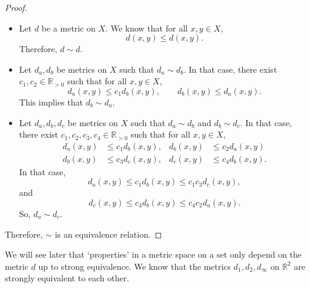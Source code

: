 \documentclass[a4paper, openany]{memoir}
\theoremstyle{definition}
\theoremstyle{plain}
\begin{document}
\begin{proof}
\hspace*{0pt}
\begin{itemize}
    \item Let $d$ be a metric on $X$. We know that for all $x, y \in X$,
    \[d(x, y) \leqslant d(x, y).\]
    Therefore, $d \sim d$.
    
    \item Let $d_a, d_b$ be metrics on $X$ such that $d_a \sim d_b$. In that case, there exist $c_1, c_2 \in \mathbb{R}_{> 0}$ such that for all $x, y \in X$,
    \[d_a(x, y) \leqslant c_1 d_b(x, y), \qquad d_b(x, y) \leqslant d_a(x, y).\]
    This implies that $d_b \sim d_a$.
    
    \item Let $d_a, d_b, d_c$ be metrics on $X$ such that $d_a \sim d_b$ and $d_b \sim d_c$. In that case, there exist $c_1, c_2, c_3, c_4 \in \mathbb{R}_{> 0}$ such that for all $x, y \in X$,
    \begin{align*}
        d_a(x, y) &\leqslant c_1 d_b(x, y), & d_b(x, y) &\leqslant c_2 d_a(x, y) \\
        d_b(x, y) &\leqslant c_3 d_c(x, y), & d_c(x, y) &\leqslant c_4 d_b(x, y).
    \end{align*}
    In that case,
    \[d_a(x, y) \leqslant c_1 d_b(x, y) \leqslant c_1 c_3 d_c(x, y),\]
    and
    \[d_c(x, y) \leqslant c_4 d_b(x, y) \leqslant c_4 c_2 d_a(x, y).\]
    So, $d_a \sim d_c$.
\end{itemize}
Therefore, $\sim$ is an equivalence relation.
\end{proof}

\noindent We will see later that `properties' in a metric space on a set only depend on the metric $d$ up to strong equivalence. We know that the metrics $d_1, d_2, d_\infty$ on $\mathbb{R}^2$ are strongly equivalent to each other. 
\end{document}
